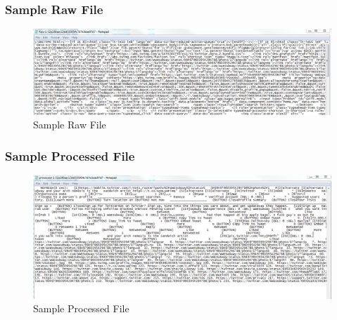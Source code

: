 \subsubsection{Sample Raw File}
\begin{figure}[ht]    
    \begin{center}
        \includegraphics[scale=0.5]{Raw_sample.png}
        \caption{Sample Raw File}
        \label{Sample Raw File}
    \end{center}
\end{figure}

\subsubsection{Sample Processed File}
\begin{figure}[ht]    
    \begin{center}
        \includegraphics[scale=0.5]{processed_sample.png}
        \caption{Sample Processed File}
        \label{Sample Processed File}
    \end{center}
\end{figure}
\newpage
